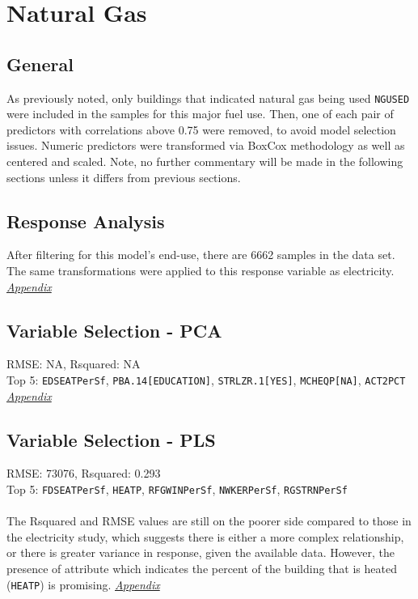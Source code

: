 \section{Natural Gas}
\label{sec:natural_gas}

\subsection{General}
As previously noted, only buildings that indicated natural gas being used \lstinline{NGUSED} were included in the samples for this major fuel use.  Then, one of each pair of predictors with correlations above 0.75 were removed, to avoid model selection issues. Numeric predictors were transformed via BoxCox methodology as well as centered and scaled.  Note, no further commentary will be made in the following sections unless it differs from previous sections.

\subsection{Response Analysis}

After filtering for this model's end-use, there are 6662 samples in the data set.  The same transformations were applied to this response variable as electricity. \textit{\hyperref[appendix:natural_gas:response]{Appendix}}

\subsection{Variable Selection - PCA}
RMSE: NA, Rsquared: NA\\
Top 5: \lstinline{EDSEATPerSf}, \lstinline{PBA.14[EDUCATION]}, \lstinline{STRLZR.1[YES]}, \lstinline{MCHEQP[NA]}, \lstinline{ACT2PCT}  \textit{\hyperref[appendix:natural_gas:pca]{Appendix}}

\subsection{Variable Selection - PLS}
RMSE: 73076, Rsquared: 0.293\\
Top 5: \lstinline{FDSEATPerSf}, \lstinline{HEATP}, \lstinline{RFGWINPerSf}, \lstinline{NWKERPerSf}, \lstinline{RGSTRNPerSf}\\
\\[0.1in]
The Rsquared and RMSE values are still on the poorer side compared to those in the electricity study, which suggests there is either a more complex relationship, or there is greater variance in response, given the available data. However, the presence of attribute which indicates the percent of the building that is heated (\lstinline{HEATP}) is promising.   \textit{\hyperref[appendix:natural_gas:pls]{Appendix}}

